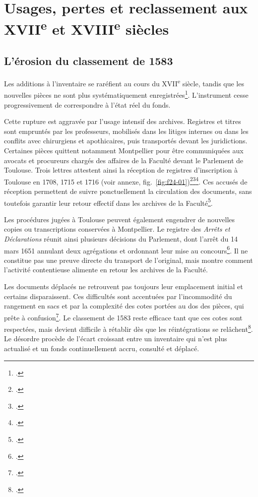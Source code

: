\section{Usages, pertes et reclassement aux XVII\textsuperscript{e} et XVIII\textsuperscript{e} siècles}

\subsection{L'érosion du classement de 1583}

Les additions à l'inventaire se raréfient au cours du XVII\textsuperscript{e} siècle, tandis que les nouvelles pièces ne sont plus systématiquement enregistrées\footcite[p.~XIII, vue~32 de la version numérisée]{CalmetteCartulaire1912}. L'instrument cesse progressivement de correspondre à l'état réel du fonds.

Cette rupture est aggravée par l'usage intensif des archives. Registres et titres sont empruntés par les professeurs, mobilisés dans les litiges internes ou dans les conflits avec chirurgiens et apothicaires, puis transportés devant les juridictions. Certaines pièces quittent notamment Montpellier pour être communiquées aux avocats et procureurs chargés des affaires de la Faculté devant le Parlement de Toulouse. Trois lettres attestent ainsi la réception de registres d'inscription à Toulouse en 1708, 1715 et 1716 (voir annexe, fig.~\ref{fig:f24-01})\footcite{AHFMF22}\footcite{AHFMF23}\footcite{AHFMF24}. Ces accusés de réception permettent de suivre ponctuellement la circulation des documents, sans toutefois garantir leur retour effectif dans les archives de la Faculté\footcite[p.~XIV, vue~33 de la version numérisée]{CalmetteCartulaire1912}.

Les procédures jugées à Toulouse peuvent également engendrer de nouvelles copies ou transcriptions conservées à Montpellier. Le registre des \emph{Arrêts et Déclarations} réunit ainsi plusieurs décisions du Parlement, dont l'arrêt du 14 mars 1651 annulant deux agrégations et ordonnant leur mise au concours\footcite[fol.~85~v\textsuperscript{o}, acte~91]{AHFMS3}. Il ne constitue pas une preuve directe du transport de l'original, mais montre comment l'activité contentieuse alimente en retour les archives de la Faculté.

Les documents déplacés ne retrouvent pas toujours leur emplacement initial et certains disparaissent. Ces difficultés sont accentuées par l'incommodité du rangement en sacs et par la complexité des cotes portées au dos des pièces, qui prête à confusion\footcite[p.~XIII, vue~42 de la version numérisée]{CalmetteCartulaire1912}. Le classement de 1583 reste efficace tant que ces cotes sont respectées, mais devient difficile à rétablir dès que les réintégrations se relâchent\footcite[p.~XIII--XIV, vues~42 à 43 de la version numérisée]{CalmetteCartulaire1912}. Le désordre procède de l'écart croissant entre un inventaire qui n'est plus actualisé et un fonds continuellement accru, consulté et déplacé.

